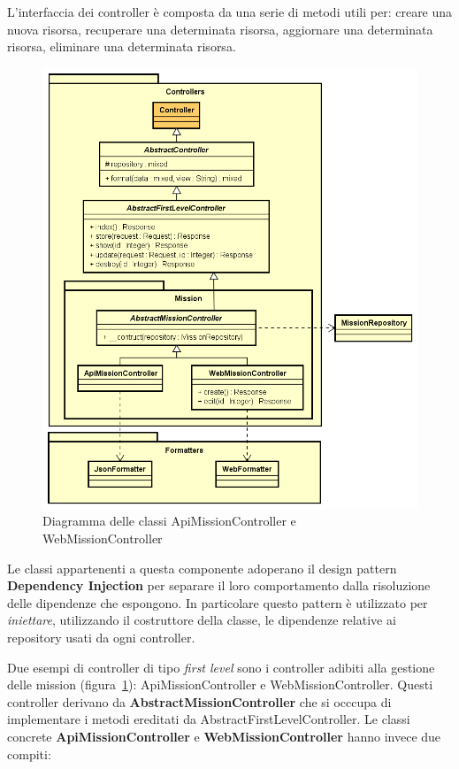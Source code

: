 L'interfaccia dei controller è composta da una serie di metodi utili per: creare una nuova risorsa, recuperare una determinata risorsa, aggiornare una determinata risorsa, eliminare una determinata risorsa. \bigskip

\begin{figure}[H]
	\centering
  \includegraphics[scale=0.5, width=\textwidth]{immagini/components/controllers_example.png}
  \caption{Diagramma delle classi ApiMissionController e WebMissionController}
	\label{fig:controller-example} 
\end{figure}

Le classi appartenenti a questa componente adoperano il design pattern \textbf{Dependency Injection} per separare il loro comportamento dalla risoluzione delle dipendenze che espongono. In particolare questo pattern è utilizzato per \textit{iniettare}, utilizzando il costruttore della classe, le dipendenze relative ai repository usati da ogni controller.
 
Due esempi di controller di tipo \textit{first level} sono i controller adibiti alla gestione delle mission (figura~\ref{fig:controller-example}): ApiMissionController e WebMissionController. Questi controller derivano da \textbf{AbstractMissionController} che si occcupa di implementare i metodi ereditati da AbstractFirstLevelController. Le classi concrete \textbf{ApiMissionController} e \textbf{WebMissionController} hanno invece due compiti: 

